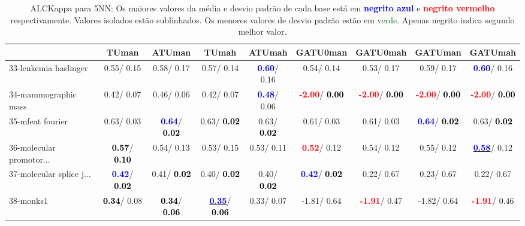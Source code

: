 \begin{table}[h]
\caption{ALCKappa para 5NN: Os maiores valores da média e desvio padrão de cada base está em \textcolor{blue}{\textbf{negrito azul}} e \textcolor{red}{\textbf{negrito vermelho}} respectivamente. Valores isolados estão sublinhados. Os menores valores de desvio padrão estão em \textcolor{darkgreen}{verde}. Apenas negrito indica segundo melhor valor.}
\begin{center}\begin{tabular}{lc|c|c|c|c|c|c|c}
 & TUman & \textbf{ATUman} & TUmah & \textbf{ATUmah} & GATU0man & GATU0mah & GATUman & GATUmah\\ \hline 33-leukemia haslinger &   0.55/  0.15 &   0.58/  0.17 &   0.57/  0.14 & \textcolor{blue}{\textbf{  0.60}}/  0.16 &   0.54/  0.14 &   0.53/  0.17 &   0.59/  0.17 & \textcolor{blue}{\textbf{  0.60}}/  0.16 \\
34-mammographic mass &   0.42/  0.07 &   0.46/  0.06 &   0.42/  0.07 & \textcolor{blue}{\textbf{  0.48}}/  0.06 & \textcolor{red}{\textbf{ -2.00}}/\textcolor{black}{\textbf{  0.00}} & \textcolor{red}{\textbf{ -2.00}}/\textcolor{black}{\textbf{  0.00}} & \textcolor{red}{\textbf{ -2.00}}/\textcolor{black}{\textbf{  0.00}} & \textcolor{red}{\textbf{ -2.00}}/\textcolor{black}{\textbf{  0.00}} \\
35-mfeat fourier &   0.63/  0.03 & \textcolor{blue}{\textbf{  0.64}}/\textcolor{black}{\textbf{  0.02}} &   0.63/\textcolor{black}{\textbf{  0.02}} &   0.63/\textcolor{black}{\textbf{  0.02}} &   0.61/  0.03 &   0.61/  0.03 & \textcolor{blue}{\textbf{  0.64}}/\textcolor{black}{\textbf{  0.02}} &   0.63/\textcolor{black}{\textbf{  0.02}} \\
36-molecular promotor... & \textcolor{black}{\textbf{  0.57}}/\textcolor{black}{\textbf{  0.10}} &   0.54/  0.13 &   0.53/  0.15 &   0.53/  0.11 & \textcolor{red}{\textbf{  0.52}}/  0.12 &   0.54/  0.12 &   0.55/  0.12 & \underline{\textcolor{blue}{\textbf{  0.58}}}/  0.12 \\
37-molecular splice j... & \textcolor{blue}{\textbf{  0.42}}/\textcolor{black}{\textbf{  0.02}} &   0.41/\textcolor{black}{\textbf{  0.02}} &   0.40/\textcolor{black}{\textbf{  0.02}} &   0.40/\textcolor{black}{\textbf{  0.02}} & \textcolor{blue}{\textbf{  0.42}}/\textcolor{black}{\textbf{  0.02}} &   0.22/  0.67 &   0.23/  0.67 &   0.22/  0.67 \\
38-monks1 & \textcolor{black}{\textbf{  0.34}}/  0.08 & \textcolor{black}{\textbf{  0.34}}/\textcolor{black}{\textbf{  0.06}} & \underline{\textcolor{blue}{\textbf{  0.35}}}/\textcolor{black}{\textbf{  0.06}} &   0.33/  0.07 &  -1.81/  0.64 & \textcolor{red}{\textbf{ -1.91}}/  0.47 &  -1.82/  0.64 & \textcolor{red}{\textbf{ -1.91}}/  0.46 \\

\end{tabular}
\end{center}
\end{table}
